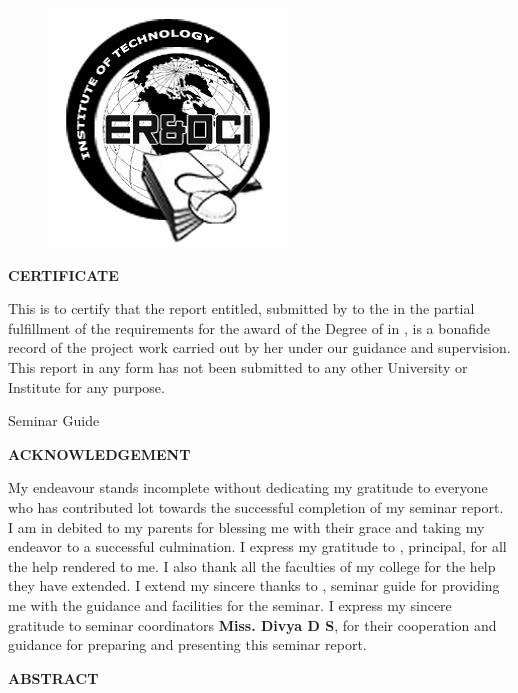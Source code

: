 \documentclass[12pt,a4paper]{report}
\begin{document}

\newpage
\thispagestyle{empty}
\begin{center}
{\insti{}}

\begin{figure}[ht]
\centering
\includegraphics[scale=0.5]{logo}
\end{figure}
{\large{\textbf{CERTIFICATE}}}

\end{center}

This is to certify that the report entitled,\textbf{ \projectname{}} submitted by \textbf{\stud{}} to the \uni{} in the partial fulfillment of the requirements for the award of the Degree of \degree{} in \stream{}, \depts{} is a bonafide record of the project work carried out by her under our guidance and supervision. This report in any form has not been submitted to any other University or Institute for any purpose.
\vspace{25mm}
 \\         
\begin{flushright} Seminar Guide \end{flushright} 
                                                                                     

\newpage
{}
\begin{center}
\textbf{ACKNOWLEDGEMENT}
\end{center} 
My endeavour stands incomplete without dedicating my gratitude to everyone who has
contributed lot towards the successful completion of my seminar report. I am in debited
to my parents for blessing me with their grace and taking my endeavor to a successful
culmination. I express my gratitude to \textbf{\guide{}}, principal, \instis{} for all the help rendered
to me. I also thank all the faculties of my college for the help they have extended. I
extend my sincere thanks to \textbf{\guide{}}, seminar guide for providing me with the guidance and facilities for the seminar. I
express my sincere gratitude to seminar coordinators \textbf{Miss.
Divya D S}, for their cooperation and guidance for preparing and presenting this seminar
report.
 
\newpage
\begin{center}
\textbf{ABSTRACT}
\end{center}  

	


\tableofcontents
\listoffigures




%

\end{document}

